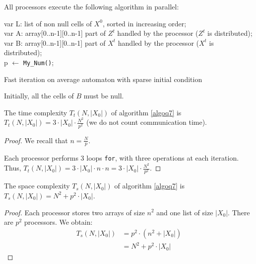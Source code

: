 All processors execute the following algorithm in parallel:

\begin{algorithm}[H]
    \DontPrintSemicolon
    \LinesNotNumbered
    var L: list of non null cells of $X^0$, sorted in increasing order; \\
    var A: array[0..n-1][0..n-1] part of $Z^t$ handled by the processor ($Z^t$ is distributed); \\
    var B: array[0..n-1][0..n-1] part of $X^t$ handled by the processor ($X^t$ is distributed); \\ 
    p $\leftarrow$ \texttt{My\_Num()};\\
\caption{Fast iteration on average automaton with sparse initial condition\label{algoq7}}
\end{algorithm}

Initially, all the cells of $B$ must be null.

\begin{prop}
 The time complexity $T_t(N,|X_0|)$ of algorithm \ref{algoq7} is $T_t(N,|X_0|) = 3 \cdot |X_0| \cdot \frac{N^2}{p^2}$ (we do not count communication time).
\end{prop}

\begin{proof}
 We recall that $n = \frac{N}{p}$.
 
 Each processor performs 3 loops \texttt{for}, with three operations at each iteration. Thus, $T_t(N,|X_0|) = 3 \cdot |X_0| \cdot n \cdot n = 3 \cdot |X_0| \cdot \frac{N^2}{p^2}$.
\end{proof}

\begin{prop}
 The space complexity $T_s(N,|X_0|)$ of algorithm \ref{algoq7} is $T_s(N,|X_0|) = N^2 + p^2 \cdot |X_0|$.
\end{prop}

\begin{proof}
 Each processor stores two arrays of size $n^2$ and one list of size $|X_0|$. There are $p^2$ processors. We obtain:
 \[
    \begin{split}
        T_s(N,|X_0|) & = p^2 \cdot (n^2 + |X_0|) \\
                     & = N^2 + p^2 \cdot |X_0|
    \end{split}
 \] 
\end{proof}

